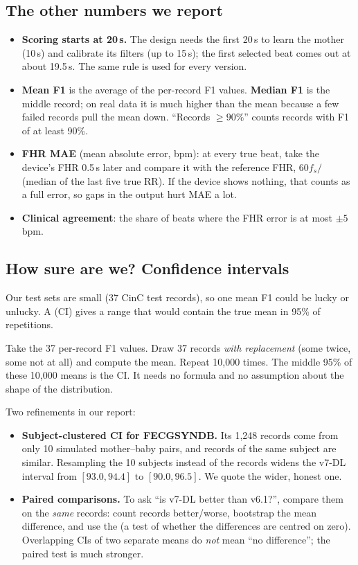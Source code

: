 \documentclass[11pt]{article}
\begin{document}
\subsection{The other numbers we report}
\begin{itemize}
  \item \textbf{Scoring starts at 20\,s.} The design needs the first 20\,s to learn the mother (10\,s) and calibrate its filters (up to 15\,s); the first selected beat comes out at about 19.5\,s. The same rule is used for every version.
  \item \textbf{Mean F1} is the average of the per-record F1 values. \textbf{Median F1} is the middle record; on real data it is much higher than the mean because a few failed records pull the mean down. ``Records $\ge 90\%$'' counts records with F1 of at least 90\%.
  \item \textbf{FHR MAE} (mean absolute error, bpm): at every true beat, take the device's FHR 0.5\,s later and compare it with the reference FHR, $60 f_s/$(median of the last five true RR). If the device shows nothing, that counts as a full error, so gaps in the output hurt MAE a lot.
  \item \textbf{Clinical agreement}: the share of beats where the FHR error is at most $\pm5$\,bpm.
\end{itemize}

\subsection{How sure are we? Confidence intervals}
\label{sec:ci}
Our test sets are small (37 CinC test records), so one mean F1 could be lucky or unlucky. A  (CI) gives a range that would contain the true mean in 95\% of repetitions.

\begin{simple}
Take the 37 per-record F1 values. Draw 37 records \emph{with replacement} (some twice, some not at all) and compute the mean. Repeat 10,000 times. The middle 95\% of these 10,000 means is the  CI. It needs no formula and no assumption about the shape of the distribution.
\end{simple}

Two refinements in our report:
\begin{itemize}
  \item \textbf{Subject-clustered CI for FECGSYNDB.} Its 1,248 records come from only 10 simulated mother--baby pairs, and records of the same subject are similar. Resampling the 10 subjects instead of the records widens the v7-DL interval from $[93.0, 94.4]$ to $[90.0, 96.5]$. We quote the wider, honest one.
  \item \textbf{Paired comparisons.} To ask ``is v7-DL better than v6.1?'', compare them on the \emph{same} records: count records better/worse, bootstrap the mean difference, and use the  (a test of whether the differences are centred on zero). Overlapping CIs of two separate means do \emph{not} mean ``no difference''; the paired test is much stronger.
\end{itemize}
\end{document}
